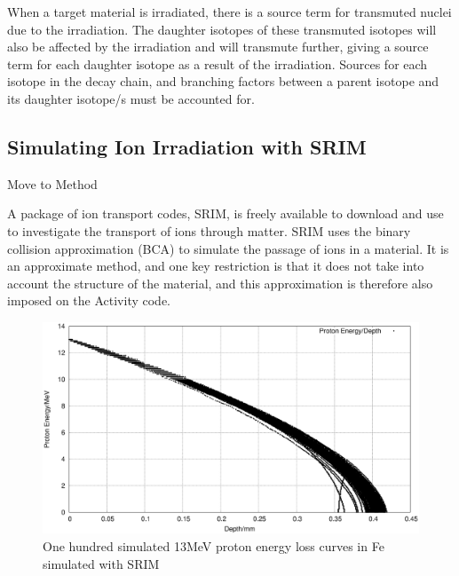 When a target material is irradiated, there is a source term for transmuted nuclei due to the irradiation.  The daughter isotopes of these transmuted isotopes will also be affected by the irradiation and will transmute further, giving a source term for each daughter isotope as a result of the irradiation.  Sources for each isotope in the decay chain, and branching factors between a parent isotope and its daughter isotope/s must be accounted for.




















\subsection{Simulating Ion Irradiation with SRIM}

Move to Method

A package of ion transport codes, SRIM, is freely available to download and use to investigate the transport of ions through matter.  SRIM uses the binary collision approximation (BCA) to simulate the passage of ions in a material.  It is an approximate method, and one key restriction is that it does not take into account the structure of the material, and this approximation is therefore also imposed on the Activity code.

\begin{figure}
  \begin{center}
    \includegraphics[width=15.0cm]{chapters/background_activity/plots/fe_13MeV.eps}
    \caption{One hundred simulated 13MeV proton energy loss curves in Fe simulated with SRIM \cite{srim}}
    \label{fig:fe13traj}
  \end{center}
\end{figure}

